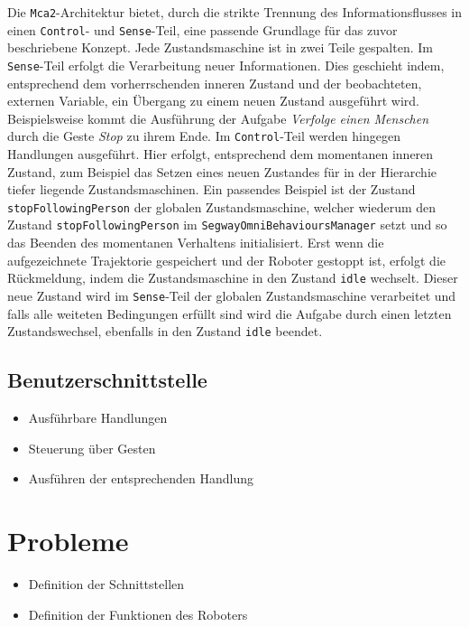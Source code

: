 Die \lstinline{Mca2}-Architektur bietet, durch die strikte Trennung des Informationsflusses in einen \lstinline{Control}- und \lstinline{Sense}-Teil, eine passende Grundlage für das zuvor beschriebene Konzept. Jede Zustandsmaschine ist in zwei Teile gespalten. Im \lstinline{Sense}-Teil erfolgt die Verarbeitung neuer Informationen. Dies geschieht indem, entsprechend dem vorherrschenden inneren Zustand und der beobachteten, externen Variable, ein Übergang zu einem neuen Zustand ausgeführt wird. Beispielsweise kommt die Ausführung der Aufgabe \textit{Verfolge einen Menschen} durch die Geste \textit{Stop} zu ihrem Ende. Im \lstinline{Control}-Teil werden hingegen Handlungen ausgeführt. Hier erfolgt, entsprechend dem momentanen inneren Zustand, zum Beispiel das Setzen eines neuen Zustandes für in der Hierarchie tiefer liegende Zustandsmaschinen. Ein passendes Beispiel ist der Zustand \lstinline{stopFollowingPerson} der globalen Zustandsmaschine, welcher wiederum den Zustand \lstinline{stopFollowingPerson} im \lstinline{SegwayOmniBehavioursManager} setzt und so das Beenden des momentanen Verhaltens initialisiert. Erst wenn die aufgezeichnete Trajektorie gespeichert und der Roboter gestoppt ist, erfolgt die Rückmeldung, indem die Zustandsmaschine in den Zustand \lstinline{idle} wechselt. Dieser neue Zustand wird im \lstinline{Sense}-Teil der globalen Zustandsmaschine verarbeitet und falls alle weiteten Bedingungen erfüllt sind wird die Aufgabe durch einen letzten Zustandswechsel, ebenfalls in den Zustand \lstinline{idle} beendet.


\subsection{Benutzerschnittstelle}
\label{benutzerschnittstelle_integration_cha}

\begin{itemize}
\item Ausführbare Handlungen
\item Steuerung über Gesten
\item Ausführen der entsprechenden Handlung
\end{itemize}

\section{Probleme}
\label{probleme_integration_sec}

\begin{itemize}
\item Definition der Schnittstellen
\item Definition der Funktionen des Roboters
\end{itemize}
